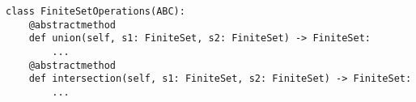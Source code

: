 \par\begin{minipage}{70ex}
\begin{verbatim}
class FiniteSetOperations(ABC):
    @abstractmethod
    def union(self, s1: FiniteSet, s2: FiniteSet) -> FiniteSet:
        ...
    @abstractmethod
    def intersection(self, s1: FiniteSet, s2: FiniteSet) -> FiniteSet:
        ...
\end{verbatim}
\end{minipage}\par